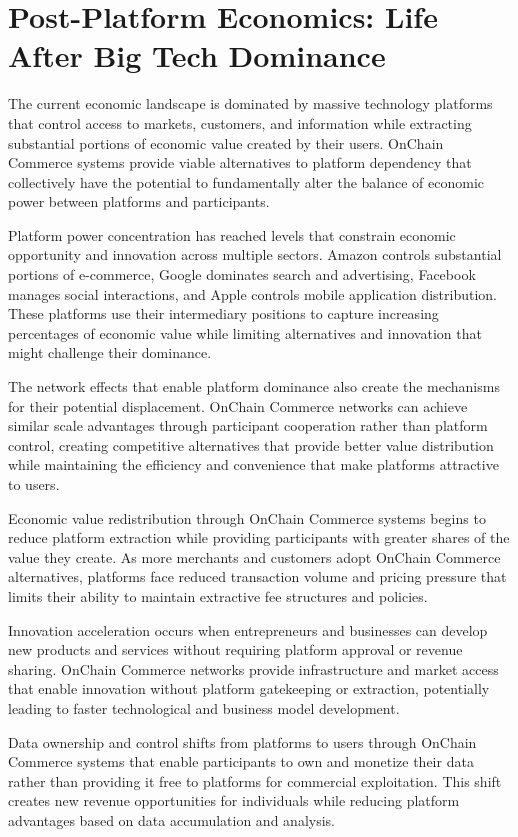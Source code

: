 \documentclass[
  Letterpaper,
]{scrbook}
\begin{document}
\section{Post-Platform Economics: Life After Big Tech
Dominance}\label{post-platform-economics-life-after-big-tech-dominance}

The current economic landscape is dominated by massive technology
platforms that control access to markets, customers, and information
while extracting substantial portions of economic value created by their
users. OnChain Commerce systems provide viable alternatives to platform
dependency that collectively have the potential to fundamentally alter
the balance of economic power between platforms and participants.

Platform power concentration has reached levels that constrain economic
opportunity and innovation across multiple sectors. Amazon controls
substantial portions of e-commerce, Google dominates search and
advertising, Facebook manages social interactions, and Apple controls
mobile application distribution. These platforms use their intermediary
positions to capture increasing percentages of economic value while
limiting alternatives and innovation that might challenge their
dominance.

The network effects that enable platform dominance also create the
mechanisms for their potential displacement. OnChain Commerce networks
can achieve similar scale advantages through participant cooperation
rather than platform control, creating competitive alternatives that
provide better value distribution while maintaining the efficiency and
convenience that make platforms attractive to users.

Economic value redistribution through OnChain Commerce systems begins to
reduce platform extraction while providing participants with greater
shares of the value they create. As more merchants and customers adopt
OnChain Commerce alternatives, platforms face reduced transaction volume
and pricing pressure that limits their ability to maintain extractive
fee structures and policies.

Innovation acceleration occurs when entrepreneurs and businesses can
develop new products and services without requiring platform approval or
revenue sharing. OnChain Commerce networks provide infrastructure and
market access that enable innovation without platform gatekeeping or
extraction, potentially leading to faster technological and business
model development.

Data ownership and control shifts from platforms to users through
OnChain Commerce systems that enable participants to own and monetize
their data rather than providing it free to platforms for commercial
exploitation. This shift creates new revenue opportunities for
individuals while reducing platform advantages based on data
accumulation and analysis.
\end{document}
